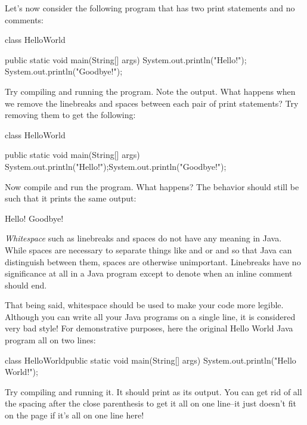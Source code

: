 Let's now consider the following program that has two print statements and no comments:
\begin{code}
class HelloWorld {

    public static void main(String[] args) {
        System.out.println("Hello!");
        System.out.println("Goodbye!");
    }

}
\end{code}
Try compiling and running the program. Note the output.
What happens when we remove the linebreaks and spaces between each pair of print statements?
Try removing them to get the following:
\begin{code}
class HelloWorld {

    public static void main(String[] args) {
        System.out.println("Hello!");System.out.println("Goodbye!");
    }

}
\end{code}
Now compile and run the program. What happens?
The behavior should still be such that it prints the same output:
\begin{code}
Hello!
Goodbye!
\end{code}
\emph{Whitespace} such as linebreaks and spaces do not have any meaning in Java.
While spaces are necessary to separate things like  and  or  and 
so that Java can distinguish between them, spaces are otherwise unimportant.
Linebreaks have no significance at all in a Java program except to denote when an inline comment
should end.

That being said, whitespace should be used to make your code more legible. Although you can write
all your Java programs on a single line, it is considered very bad style!
For demonstrative purposes, here the original Hello World Java program all on two lines:
\begin{code}
class HelloWorld{public static void main(String[] args)
    {System.out.println("Hello World!");}}
\end{code}
Try compiling and running it. It should print  as its output.
You can get rid of all the spacing after the close parenthesis \ic{)} to get it all on one line--it
just doesn't fit on the page if it's all on one line here!
